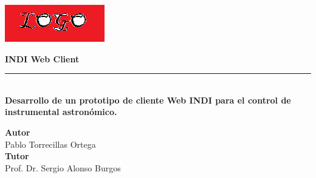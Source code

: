 \begin{titlepage}


\setlength{\centeroffset}{-0.5\oddsidemargin}
\addtolength{\centeroffset}{0.5\evensidemargin}
\thispagestyle{empty}

\noindent\hspace*{\centeroffset}\begin{minipage}{\textwidth}

\centering

%

 \vspace{3.3cm}

\includegraphics{imagenes/logo.png}
 \vspace{0.5cm}


{\Huge\bfseries INDI Web Client\\
}
\noindent\rule[-1ex]{\textwidth}{3pt}\\[3.5ex]
{\large\bfseries Desarrollo de un prototipo de cliente Web INDI para el control de instrumental astronómico.\\[4cm]}
\end{minipage}

\vspace{2.5cm}
\noindent\hspace*{\centeroffset}\begin{minipage}{\textwidth}
\centering

\textbf{Autor}\\ {Pablo Torrecillas Ortega}\\[2.5ex]
\textbf{Tutor}\\
{Prof. Dr. Sergio Alonso Burgos}\\[2cm]
\end{minipage}


\end{titlepage}
